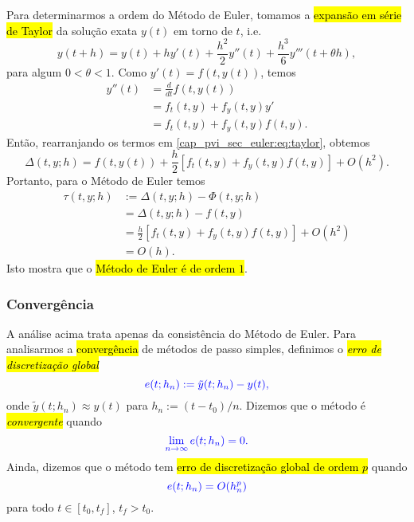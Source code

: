 Para determinarmos a ordem do Método de Euler, tomamos a \hl{expansão em série de Taylor}{\taylor} da solução exata $y(t)$ em torno de $t$, i.e.
\begin{equation}\label{cap_pvi_sec_euler:eq:taylor}
  y(t+h) = y(t) + hy'(t) + \frac{h^2}{2}y''(t) + \frac{h^3}{6}y'''(t+\theta h),
\end{equation}
para algum $0<\theta<1$.
Como $y'(t)=f(t, y(t))$, temos
\begin{align}
  y''(t) &= \frac{d}{dt}f(t, y(t)) \\
         &= f_t(t, y) + f_y(t, y)y'\\
         &= f_t(t, y) + f_y(t, y)f(t, y).
\end{align}
Então, rearranjando os termos em \eqref{cap_pvi_sec_euler:eq:taylor}, obtemos
\begin{equation}\label{eq:pvi_delta_aux}
  \Delta(t, y; h) = f(t, y(t)) + \frac{h}{2}[f_t(t, y) + f_y(t, y)f(t, y)] + O(h^2).
\end{equation}
Portanto, para o Método de Euler temos
\begin{align}
  \tau(t, y; h) &:= \Delta(t, y; h)-\Phi(t, y; h)\\
              &= \Delta(t, y; h) - f(t, y)\\
              &= \frac{h}{2}[f_t(t, y) + f_y(t, y)f(t, y)] + O(h^2)\\
              &= O(h).
\end{align}
Isto mostra que o \hl{Método de Euler é de ordem $1$}.

\subsubsection{Convergência}

A análise acima trata apenas da consistência do Método de Euler. Para analisarmos a \hl{convergência} de métodos de passo simples, definimos o \hl{\emph{erro de discretização global}}
\begin{equation}\color{blue}e(t; h_n) := \tilde{y}(t; h_n) - y(t),
\end{equation}
onde $\tilde{y}(t; h_n) \approx y(t)$ para $h_n := (t-t_0)/n$. Dizemos que o método é \hl{\emph{convergente}} quando
\begin{equation}\color{blue}\lim_{n\to \infty} e(t; h_n) = 0.
\end{equation}
Ainda, dizemos que o método tem \hl{erro de discretização global de ordem $p$} quando
\begin{equation}\color{blue}e(t; h_n) = O(h_n^p)
\end{equation}
para todo $t\in [t_0, t_f]$, $t_f > t_0$.

